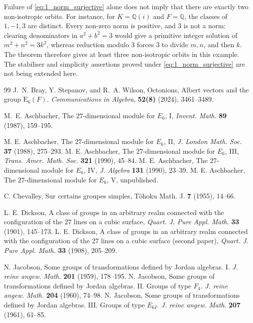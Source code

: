 \documentclass{amsart}
\newcommand{\E}{\mathrm{E}}
\theoremstyle{plain}
\numberwithin{theorem}{section}
\theoremstyle{definition}
\begin{document}
Failure of \eqref{eq:1_norm_surjective} alone does not imply that
there are exactly two non-isotropic orbits. For instance, for
$K=\mathbb Q(i)$ and $F=\mathbb Q$, the classes of $1,-1,3$ are
distinct. Every non-zero norm is positive, and $3$ is not a norm:
clearing denominators in $a^2+b^2=3$ would give a primitive integer
solution of $m^2+n^2=3k^2$, whereas reduction modulo $3$ forces
$3$ to divide $m,n$, and then $k$. The theorem therefore gives at
least three non-isotropic orbits in this example.
The stabiliser and simplicity assertions proved under
\eqref{eq:1_norm_surjective} are not being extended here.

\begin{thebibliography}{99}
 J.~N. Bray, Y. Stepanov, and R.~A. Wilson, Octonions, Albert vectors and the group $\E_6(F)$. 
	{\it Communications in Algebra}, {\bf 52(8)} (2024), 3461--3489.

 M.~E. Aschbacher, The $27$-dimensional module for  $E_6$, I,
{\it Invent. Math.} {\bf 89} (1987), 159--195.

 M. E. Aschbacher, The $27$-dimensional module for $E_6$, II,
{\it J. London Math. Soc.} {\bf 37} (1988), 275--293.
 M. E. Aschbacher, The $27$-dimensional module for  $E_6$, III,
{\it Trans. Amer. Math. Soc.} {\bf 321} (1990), 45--84.
 M. E. Aschbacher, The $27$-dimensional module for $E_6$, IV,
{\it J. Algebra} {\bf 131} (1990), 23--39.
 M. E. Aschbacher, The $27$-dimensional module for $E_6$, V,
unpublished.

 C. Chevalley, Sur certains groupes simples, T\^{o}hoku Math. J. \textbf{7} 
(1955), 14--66.

 L. E. Dickson, A class of groups in an arbitrary realm
connected with the configuration of the $27$ lines on a cubic surface,
{\it Quart. J. Pure Appl. Math.} {\bf 33} (1901), 145--173.
  L. E. Dickson, A class of groups in an arbitrary realm
connected with the configuration of the $27$ lines on a cubic surface (second paper),
{\it Quart. J. Pure Appl. Math.} {\bf 33} (1908), 205--209.

 N. Jacobson, Some groups of transformations defined by
Jordan algebras. I. {\it J. reine angew. Math.} {\bf 201} (1959), 178--195.
 N. Jacobson, Some groups of transformations defined by
Jordan algebras. II. Groups of type $F_4$. {\it J. reine angew. Math.} {\bf 204}
(1960), 74--98.
 N. Jacobson, Some groups of transformations defined by
Jordan algebras. III. Groups of type $E_{6I}$. {\it J. reine angew. Math.} {\bf 207}
(1961), 61--85.


\end{thebibliography}
\end{document}
